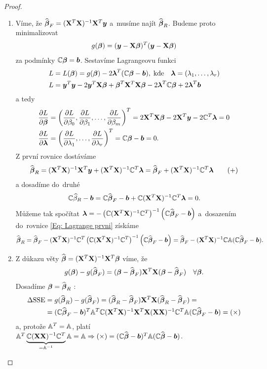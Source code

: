 \begin{proof}
\begin{enumerate}
\item
Víme, že $\wbetab_F = \xtx \X^T \yb$ a~musíme najít $\wbetab_R$. Budeme proto minimalizovat
 $$
g(\betab) = (\yb - \X \betab)^T(\yb - \X \betab)
 $$
za podmínky $\C \betab = \bb$. Sestavíme Lagrangeovu funkci
\begin{align*}
L & = L(\betab) = g(\betab) - 2 \lambdab^T(\C \betab - \bb), \; \text{kde} \quad \lambdab = (\lambda_1,\dots, \lambda_r) \\
L & = \yb^T \yb - 2 \yb^T \X \betab + \betab^T \X^T \X \betab - 2 \lambdab^T \C \betab + 2 \lambdab^T \bb
\end{align*}
a tedy
\begin{align*}
\frac{\partial L}{\partial \betab} & = \left(\parcialni{L}{\beta_0}, \parcialni{L}{\beta_1},\dots, \parcialni{L}{\beta_m} \right)^T = 2 \X^T \X \betab - 2 \X^T \yb - 2 \C^T \lambdab = 0 \\
\parcialni{L}{\lambdab} & = \left(\parcialni{L}{\lambda_1},\dots, \parcialni{L}{\lambda_r} \right)^T = \C \betab - \bb = 0.
\end{align*}
Z první rovnice dostáváme
\begin{equation}
\wbetab_R = \xtx \X^T \yb + \xtx \C^T \lambdab = \wbetab_F + \xtx \C^T \lambdab \tag{+} \label{Eq: Lagrange prvni}
\end{equation}
a dosadíme do~druhé
 $$
\C \wbeta_R - \bb = \C \wbetab_F - \bb + \C \xtx \C^T \lambdab = 0.
 $$
Můžeme tak spočítat $\lambdab = -\left(\C \xtx \C^T\right)^{-1} \left(\C \wbetab_F - \bb \right)$ a~dosazením do~rovnice \eqref{Eq: Lagrange prvni} získáme
 $$
\wbetab_R = \wbetab_F - \xtx \C^T \left(\C \xtx \C^T \right)^{-1} \left(\C \wbetab_F - \bb \right) = \wbetab_F - \xtx \C \Am (\C \wbetab_F - \bb).
 $$

\item
Z důkazu věty $\wbetab = \xtx \X^T \betab$ víme, že
 $$
g(\betab) - g(\wbetab_F) = (\betab - \wbetab_F) \X^T \X (\betab - \wbetab_F) \quad \forall \betab.
 $$
Dosadíme $\betab = \wbetab_R$ :
\begin{align*}
	\Delta \SSE & = g(\wbetab_R) - g(\wbetab_F) = (\wbetab_R - \wbetab_F) \X^T \X (\wbetab_R - \wbetab_F) = \\
	& = (\C \wbetab_F - \bb)^T \Am^T \C \xtx \X^T \X (\X \X)^{-1} \C^T \Am (\C \wbetab_F - \bb) = (\times)
\end{align*}
a, protože $\Am^T = \Am$, platí $\Am^T\underbrace{\C (\X \X)^{-1} \C^T}_{ = \Am^{-1}} \Am = \Am \Rightarrow (\times) = (\C \wbetab - \bb)^T \Am (\C \wbetab - \bb)$.

\end{enumerate}
\end{proof}


